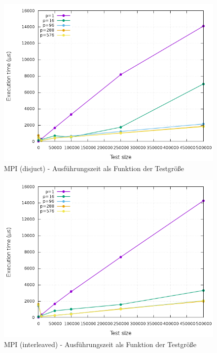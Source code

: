 \begin{figure}[htbp]
	\centering
	\includegraphics[width=404pt]{resources/plots/MPI_Disjunct_cores.png}
	\caption{MPI (disjuct) - Ausführungszeit als Funktion der Testgröße}
	\label{MPI_Disjunct_cores}
\end{figure}


\begin{figure}[htbp]
	\centering
	\includegraphics[width=404pt]{resources/plots/MPI_Interleaved_cores.png}
	\caption{MPI (interleaved) - Ausführungszeit als Funktion der Testgröße}
	\label{MPI_Interleaved_cores}
\end{figure}

